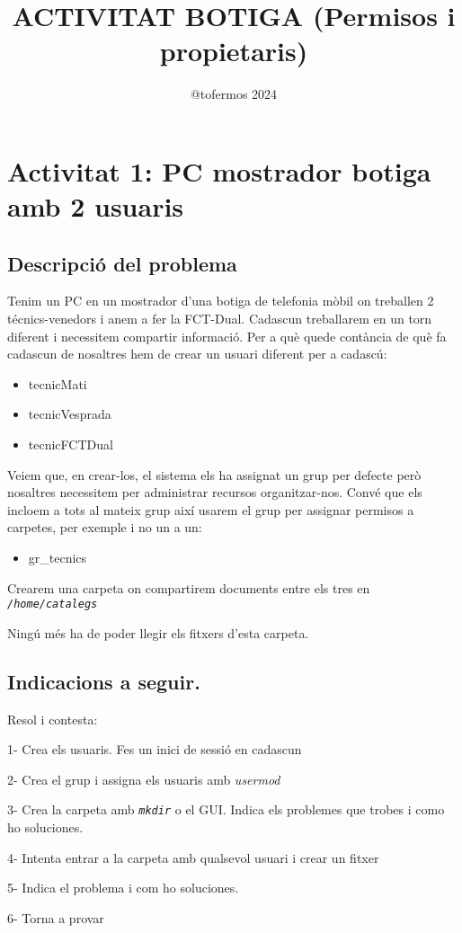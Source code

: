 \documentclass[
  a4paper,
]{article}
\title{ACTIVITAT BOTIGA (Permisos i propietaris)}
\author{@tofermos 2024}
\date{}
\providecommand{\tightlist}{%
  \setlength{\itemsep}{0pt}\setlength{\parskip}{0pt}}
\begin{document}
\maketitle

{
\setcounter{tocdepth}{2}
\tableofcontents
}
\newpage
\renewcommand\tablename{Tabla}

\section{Activitat 1: PC mostrador botiga amb 2
usuaris}\label{activitat-1-pc-mostrador-botiga-amb-2-usuaris}

\subsection{Descripció del problema}\label{descripciuxf3-del-problema}

Tenim un PC en un mostrador d'una botiga de telefonia mòbil on treballen
2 técnics-venedors i anem a fer la FCT-Dual. Cadascun treballarem en un
torn diferent i necessitem compartir informació. Per a què quede
contància de què fa cadascun de nosaltres hem de crear un usuari
diferent per a cadascú:

\begin{itemize}
\tightlist
\item
  tecnicMati
\item
  tecnicVesprada
\item
  tecnicFCTDual
\end{itemize}

Veiem que, en crear-los, el sistema els ha assignat un grup per defecte
però nosaltres necessitem per administrar recursos organitzar-nos. Convé
que els incloem a tots al mateix grup així usarem el grup per assignar
permisos a carpetes, per exemple i no un a un:

\begin{itemize}
\tightlist
\item
  gr\_tecnics
\end{itemize}

Crearem una carpeta on compartirem documents entre els tres en
\emph{\texttt{/home/catalegs}}

Ningú més ha de poder llegir els fitxers d'esta carpeta.

\subsection{Indicacions a seguir.}\label{indicacions-a-seguir.}

Resol i contesta:

1- Crea els usuaris. Fes un inici de sessió en cadascun

2- Crea el grup i assigna els usuaris amb \emph{usermod}

3- Crea la carpeta amb \emph{\texttt{mkdir}} o el GUI. Indica els
problemes que trobes i como ho soluciones.

4- Intenta entrar a la carpeta amb qualsevol usuari i crear un fitxer

5- Indica el problema i com ho soluciones.

6- Torna a provar
\end{document}
